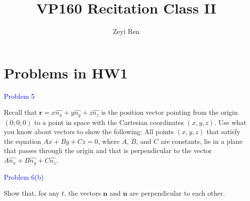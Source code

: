 \documentclass{beamer}
\title{VP160 Recitation Class II}
\author{Zeyi Ren}
\institute{UM-SJTU Joint Institute}
\begin{document}
\maketitle

\frame{\tableofcontents}

\section{Problems in HW1}
\begin{frame}
\textcolor{blue}{Problem 5} 

Recall that $\textbf{r} = x\hat{n_x}+y\hat{n_y}+z\hat{n_z}$ is the position vector pointing from the origin $(0; 0; 0)$ to a
point in space with the Cartesian coordinates $(x, y, z)$. Use what you know about vectors
to show the following: All points $(x, y, z)$ that satisfy the equation $Ax + By + Cz = 0$,
where $A$, $B$, and $C$ are constants, lie in a plane that passes through the origin and that
is perpendicular to the vector $A\hat{n_x} + B\hat{n_y} + C\hat{n_z}$.
\end{frame}

\begin{frame}
\textcolor{blue}{Problem 6(b)}

Show that, for any $t$, the vectors $\textbf{n}$ and $\dot{\textbf{n}}$ are perpendicular to each
other.
\end{frame}

\end{document}
